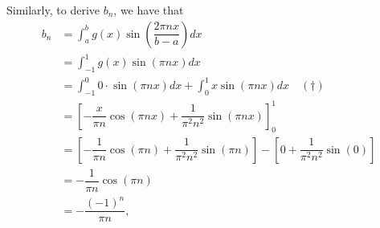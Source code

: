 \documentclass[11pt]{amsart}
\theoremstyle{plain}
\theoremstyle{definition}
\begin{document}
Similarly, to derive $b_n$, we have that 
\begin{align*}
    b_n &= \int_{a}^{b}g(x)\sin\left(\dfrac{2\pi nx}{b-a}\right)dx\\
        &= \int_{-1}^{1}g(x)\sin\left(\pi nx\right)dx\\
        &= \int_{-1}^{0}0\cdot\sin\left(\pi nx\right)dx + \int_{0}^{1}x\sin\left(\pi nx\right)dx\quad (\dagger)\\
        &= \left[-\dfrac{x}{\pi n}\cos(\pi nx) + \dfrac{1}{\pi^2 n^2}\sin(\pi nx)\right]_0^1\\
        &= \left[-\dfrac{1}{\pi n}\cos(\pi n) + \dfrac{1}{\pi^2 n^2}\sin(\pi n)\right] - \left[0 + \dfrac{1}{\pi^2 n^2}\sin(0)\right]\\
        &= -\dfrac{1}{\pi n}\cos(\pi n)\\
        &= -\dfrac{(-1)^n}{\pi n},
\end{align*}
\end{document}
